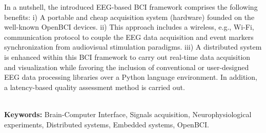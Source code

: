 In a nutshell, the introduced EEG-based \gls*{BCI} framework comprises the following benefits: i) A portable and cheap acquisition system (hardware) founded on the well-known OpenBCI devices. ii) This approach includes a wireless, e.g., Wi-Fi, communication protocol to couple the EEG data acquisition and event markers synchronization from audiovisual stimulation paradigms. iii) A distributed system is enhanced within this \gls*{BCI} framework to carry out real-time data acquisition and visualization while favoring the inclusion of conventional or user-designed EEG data processing libraries over a Python language environment. In addition, a latency-based quality assessment method is carried out.

\\[2.0cm]

\textbf{\small Keywords:} Brain-Computer Interface, Signals acquisition, Neurophysiological experiments, Distributed systems, Embedded systems, OpenBCI.\\
